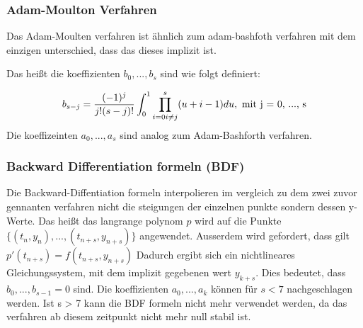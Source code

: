 \subsubsection{Adam-Moulton Verfahren}

Das Adam-Moulten verfahren ist ähnlich zum
adam-bashfoth verfahren mit dem einzigen unterschied, dass das dieses implizit ist.

Das heißt die koeffizienten $b_{0}, ..., b_{s}$ sind wie folgt definiert:

$$
b_{s - j} = \frac{(-1)^j}{j!(s - j)!} \int_0^{1} \prod_{i = 0 \\ i \neq j}^{s} (u + i - 1) du, \text{ mit j = 0, ..., s}
$$
Die koeffizeinten $a_0, ..., a_s$ sind analog zum Adam-Bashforth verfahren.


\subsubsection{Backward Differentiation formeln (BDF)}

Die Backward-Diffentiation formeln interpolieren im vergleich zu dem zwei zuvor gennanten verfahren nicht 
die steigungen der einzelnen punkte sondern dessen y-Werte.
Das heißt das langrange polynom $p$ wird auf die Punkte $\{ (t_n, y_n), ..., (t_{n + s}, y_{n + s}) \}$ angewendet.
Ausserdem wird gefordert, dass gilt $p'(t_{n + s}) = f(t_{n + s}, y_{n + s})$
Dadurch ergibt sich ein nichtlineares Gleichungssystem, mit dem implizit gegebenen wert $y_{k + s}$.
Dies bedeutet, dass $b_0, ...,b_{s - 1} = 0$ sind.
Die koeffizienten $a_0, ..., a_k$ können für $s < 7$ nachgeschlagen werden.
Ist s  > 7 kann die BDF formeln nicht mehr verwendet werden, da das verfahren ab diesem zeitpunkt nicht mehr null stabil ist.

















